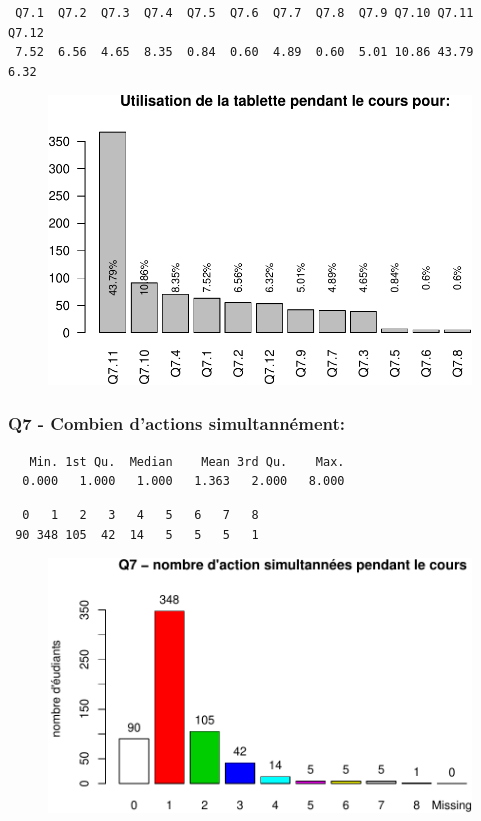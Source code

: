 \documentclass[]{article}
\begin{document}
\begin{verbatim}
 Q7.1  Q7.2  Q7.3  Q7.4  Q7.5  Q7.6  Q7.7  Q7.8  Q7.9 Q7.10 Q7.11 Q7.12 
 7.52  6.56  4.65  8.35  0.84  0.60  4.89  0.60  5.01 10.86 43.79  6.32 
\end{verbatim}

\begin{figure}[htbp]
\centering
\includegraphics{qs_etudiants_files/figure-latex/q7_simple-1.pdf}
\end{figure}

\subsubsection{Q7 - Combien d'actions
simultannément:}\label{q7---combien-dactions-simultannement}

\begin{verbatim}
   Min. 1st Qu.  Median    Mean 3rd Qu.    Max. 
  0.000   1.000   1.000   1.363   2.000   8.000 
\end{verbatim}

\begin{verbatim}
  0   1   2   3   4   5   6   7   8 
 90 348 105  42  14   5   5   5   1 
\end{verbatim}

\begin{figure}[htbp]
\centering
\includegraphics{qs_etudiants_files/figure-latex/Q7_actions_sim-1.pdf}
\end{figure}
\end{document}
